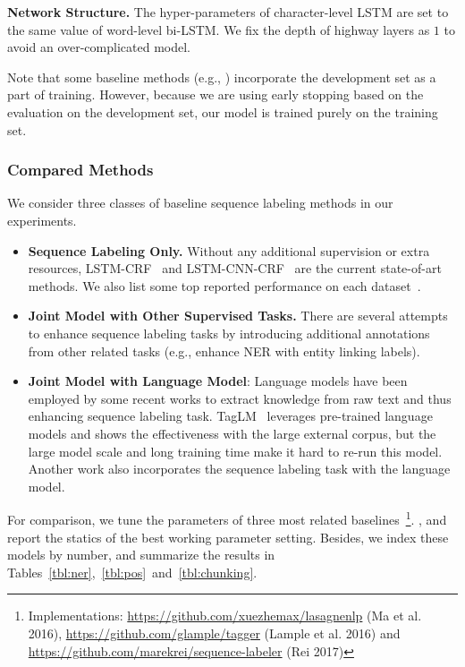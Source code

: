 \documentclass[letterpaper]{article} \usepackage{aaai18}  \usepackage{times}  \usepackage{helvet}  \usepackage{courier}  \usepackage{url}  \usepackage{graphicx}  \usepackage{multirow}
\begin{document}
\noindent\textbf{Network Structure.} The hyper-parameters of character-level LSTM are set to the same value of word-level bi-LSTM.
We fix the depth of highway layers as $1$ to avoid an over-complicated model.

Note that some baseline methods (e.g., \cite{Chiu2016NamedER,peters2017semi}) incorporate the development set as a part of training. However, because we are using early stopping based on the evaluation on the development set, our model is trained purely on the training set. 

\subsubsection{Compared Methods}
We consider three classes of baseline sequence labeling methods in our experiments.
\begin{itemize}[noitemsep,nolistsep]
    \item \textbf{Sequence Labeling Only.}
    Without any additional supervision or extra resources, LSTM-CRF~\cite{2016naacl} and LSTM-CNN-CRF~\cite{ma-hovy:2016:P16-1} are the current state-of-art methods.
    We also list some top reported performance on each dataset~\cite{Collobert2011NaturalLP,luo2015joint,Chiu2016NamedER,yang2017transfer,peters2017semi,manning2011part,sogaard2016deep,sun2014structure}.

    \item \textbf{Joint Model with Other Supervised Tasks.}
    There are several attempts~\cite{luo2015joint,yang2017transfer} to enhance sequence labeling tasks by introducing additional annotations from other related tasks (e.g., enhance NER with entity linking labels). 

    \item \textbf{Joint Model with Language Model}:
    Language models have been employed by some recent works to extract knowledge from raw text and thus enhancing sequence labeling task. 
    TagLM~\cite{peters2017semi} leverages pre-trained language models and shows the effectiveness with the large external corpus, 
    but the large model scale and long training time make it hard to re-run this model.
    Another work \cite{rei2017semi} also incorporates the sequence labeling task with the language model.

\end{itemize}
For comparison, we tune the parameters of three most related baselines~\cite{ma-hovy:2016:P16-1,2016naacl,rei2017semi}\footnote{Implementations: \url{https://github.com/xuezhemax/lasagnenlp} (Ma et al. 2016), \url{https://github.com/glample/tagger} (Lample et al. 2016) and \url{https://github.com/marekrei/sequence-labeler} (Rei 2017)}.
    , and report the statics of the best working parameter setting.
Besides, we index these models by number, and summarize the results in Tables~\ref{tbl:ner},~\ref{tbl:pos}~and~\ref{tbl:chunking}.
\end{document}
